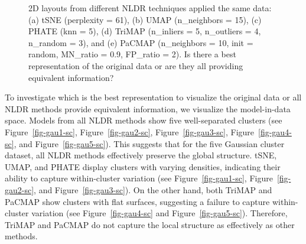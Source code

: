 \documentclass[
  12pt]{article}
\begin{document}
\begin{figure}[H]


\caption{\label{fig-nldervis5Gau}2D layouts from different NLDR
techniques applied the same data: (a) tSNE (perplexity = 61), (b) UMAP
(n\_neighbors = 15), (c) PHATE (knn = 5), (d) TriMAP (n\_inliers = 5,
n\_outliers = 4, n\_random = 3), and (e) PaCMAP (n\_neighbors = 10, init
= random, MN\_ratio = 0.9, FP\_ratio = 2). Is there a best
representation of the original data or are they all providing equivalent
information?}

\end{figure}%

To investigate which is the best representation to visualize the
original data or all NLDR methods provide equivalent information, we
visualize the model-in-data space. Models from all NLDR methods show
five well-separated clusters (see Figure~\ref{fig-gau1-sc},
Figure~\ref{fig-gau2-sc}, Figure~\ref{fig-gau3-sc},
Figure~\ref{fig-gau4-sc}, and Figure~\ref{fig-gau5-sc}). This suggests
that for the five Gaussian cluster dataset, all NLDR methods effectively
preserve the global structure. tSNE, UMAP, and PHATE display clusters
with varying densities, indicating their ability to capture
within-cluster variation (see Figure~\ref{fig-gau1-sc},
Figure~\ref{fig-gau2-sc}, and Figure~\ref{fig-gau3-sc}). On the other
hand, both TriMAP and PaCMAP show clusters with flat surfaces,
suggesting a failure to capture within-cluster variation (see
Figure~\ref{fig-gau4-sc} and Figure~\ref{fig-gau5-sc}). Therefore,
TriMAP and PaCMAP do not capture the local structure as effectively as
other methods.
\end{document}
